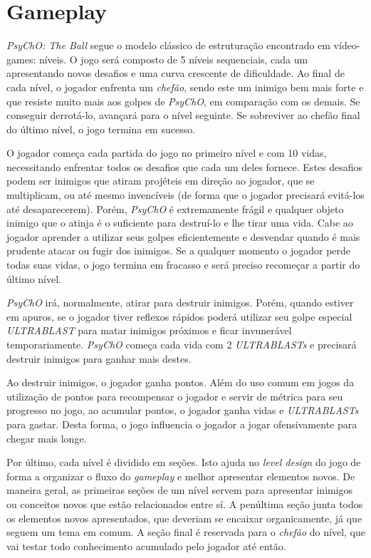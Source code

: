 \section{Gameplay}
\label{sec:gameplay}

\textit{PsyChO: The Ball} segue o modelo clássico de estruturação encontrado em vídeo-games: níveis. O jogo será composto de 5 níveis sequenciais, cada um apresentando novos desafios e uma curva crescente de dificuldade. Ao final de cada nível, o jogador enfrenta um \textit{chefão}, sendo este um inimigo bem mais forte e que resiste muito mais aos golpes de \textit{PsyChO}, em comparação com os demais. Se conseguir derrotá-lo, avançará para o nível seguinte. Se sobreviver ao chefão final do último nível, o jogo termina em sucesso.

O jogador começa cada partida do jogo no primeiro nível e com 10 vidas, necessitando enfrentar todos os desafios que cada um deles fornece. Estes desafios podem ser inimigos que atiram projéteis em direção ao jogador, que se multiplicam, ou até mesmo invencíveis (de forma que o jogador precisará evitá-los até desaparecerem). Porém, \textit{PsyChO} é extremamente frágil e qualquer objeto inimigo que o atinja é o suficiente para destruí-lo e lhe tirar uma vida. Cabe ao jogador aprender a utilizar seus golpes eficientemente e desvendar quando é mais prudente atacar ou fugir dos inimigos. Se a qualquer momento o jogador perde todas suas vidas, o jogo termina em fracasso e será preciso recomeçar a partir do último nível.

\textit{PsyChO} irá, normalmente, atirar para destruir inimigos. Porém, quando estiver em apuros, se o jogador tiver reflexos rápidos poderá utilizar seu golpe especial \textit{ULTRABLAST} para matar inimigos próximos e ficar invunerável temporariamente. \textit{PsyChO} começa cada vida com 2 \textit{ULTRABLASTs} e precisará destruir inimigos para ganhar mais destes.

Ao destruir inimigos, o jogador ganha pontos. Além do uso comum em jogos da utilização de pontos para recompensar o jogador e servir de métrica para seu progresso no jogo, ao acumular pontos, o jogador ganha vidas e \textit{ULTRABLASTs} para gastar. Desta forma, o jogo influencia o jogador a jogar ofensivamente para chegar mais longe.

Por último, cada nível é dividido em seções. Isto ajuda no \textit{level design} do jogo de forma a organizar o fluxo do \textit{gameplay} e melhor apresentar elementos novos. De maneira geral, as primeiras seções de um nível servem para apresentar inimigos ou conceitos novos que estão relacionados entre sí. A penúltima seção junta todos os elementos novos apresentados, que deveriam se encaixar organicamente, já que seguem um tema em comum. A seção final é reservada para o \textit{chefão} do nível, que vai testar todo conhecimento acumulado pelo jogador até então.

